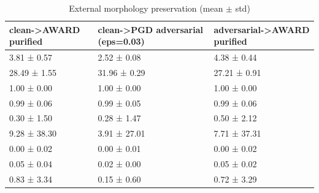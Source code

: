 \begin{table}[htbp]\centering\small
\caption{External morphology preservation (mean $\pm$ std)}\label{tab:extmorph}
\begin{tabular}{lll}
\hline
clean->AWARD purified & clean->PGD adversarial (eps=0.03) & adversarial->AWARD purified \\
\hline
3.81 ± 0.57 & 2.52 ± 0.08 & 4.38 ± 0.44 \\
28.49 ± 1.55 & 31.96 ± 0.29 & 27.21 ± 0.91 \\
1.00 ± 0.00 & 1.00 ± 0.00 & 1.00 ± 0.00 \\
0.99 ± 0.06 & 0.99 ± 0.05 & 0.99 ± 0.06 \\
0.30 ± 1.50 & 0.28 ± 1.47 & 0.50 ± 2.12 \\
9.28 ± 38.30 & 3.91 ± 27.01 & 7.71 ± 37.31 \\
0.00 ± 0.02 & 0.00 ± 0.01 & 0.00 ± 0.02 \\
0.05 ± 0.04 & 0.02 ± 0.00 & 0.05 ± 0.02 \\
0.83 ± 3.34 & 0.15 ± 0.60 & 0.72 ± 3.29 \\
\hline
\end{tabular}
\end{table}
